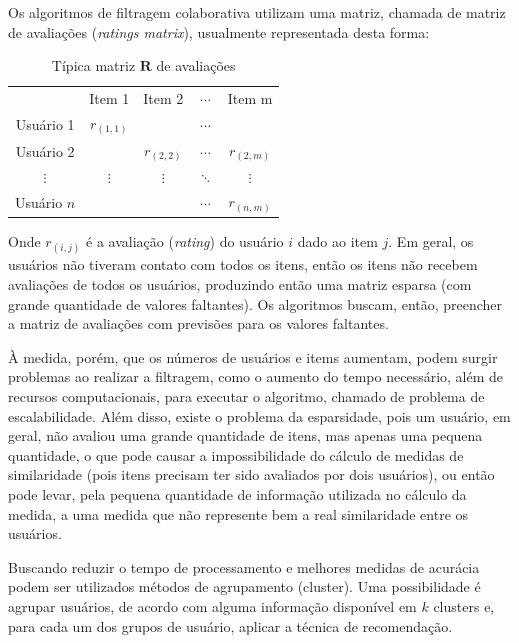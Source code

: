 \documentclass[12pt,a4paper,header]{abnt}
\begin{document}
Os algoritmos de filtragem colaborativa utilizam uma matriz, chamada de matriz de avaliações (\textit{ratings matrix}), usualmente representada desta forma:

\begin{table}[!h]
\centering
\caption{Típica matriz $\mathbf{R}$ de avaliações}
\label{rating_matrix}
\begin{tabular}{c|c|c|c|c}
\hline
            & Item 1      & Item 2      & $\cdots$ & Item m      \\
Usuário 1   & $r_{(1, 1)}$ &             & $\cdots$  &             \\
Usuário 2   &  & $r_{(2, 2)}$ & $\cdots$ & $r_{(2, m)}$ \\
$\vdots$       &    $\vdots$  & $\vdots$       &  $\ddots$ & $\vdots$ \\
Usuário $n$ &  &             & $\cdots$ & $r_{(n, m)}$ \\
\hline
\end{tabular}
\end{table}

Onde $r_{(i, j)}$ é a avaliação (\textit{rating}) do usuário $i$ dado ao item $j$. Em geral, os usuários não tiveram contato com todos os itens, então os itens não recebem avaliações de todos os usuários, produzindo então uma matriz esparsa (com grande quantidade de valores faltantes). Os algoritmos buscam, então, preencher a matriz de avaliações com previsões para os valores faltantes.

À medida, porém, que os números de usuários e items aumentam, podem surgir problemas ao realizar a filtragem, como o aumento do tempo necessário, além de recursos computacionais, para executar o algoritmo, chamado de problema de escalabilidade\cite{dakhel2011new}. Além disso, existe o problema da esparsidade, pois um usuário, em geral, não avaliou uma grande quantidade de itens, mas apenas uma pequena quantidade, o que pode causar a impossibilidade do cálculo de medidas de similaridade (pois itens precisam ter sido avaliados por dois usuários), ou então pode levar, pela pequena quantidade de informação utilizada no cálculo da medida, a uma medida que não represente bem a real similaridade entre os usuários\cite{dakhel2011new}.

Buscando reduzir o tempo de processamento e melhores medidas de acurácia podem ser utilizados métodos de agrupamento (cluster)\cite{o1999clustering}. Uma possibilidade é agrupar usuários, de acordo com alguma informação disponível em $k$ clusters e, para cada um dos grupos de usuário, aplicar a técnica de recomendação.  
\end{document}
